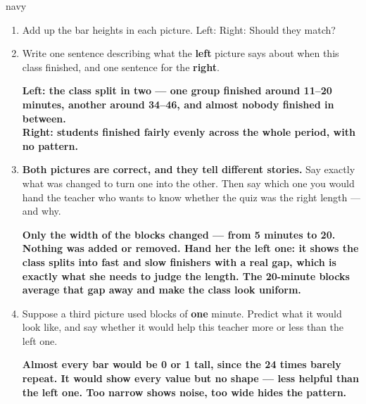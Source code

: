 \documentclass[12pt]{article}
\newcommand{\answerspace}[2]{\par\nopagebreak\noindent\begin{minipage}[t][#1][t]{\linewidth}%
  \color{keyred}\bfseries #2\end{minipage}\par}
\begin{document}
\begin{scenariobox}{navy}
\normalsize
\begin{enumerate}[label=\textbf{\alph*.}, leftmargin=1.8em, itemsep=6pt]
  \item Add up the bar heights in each picture. Left:  \quad
        Right:  \quad Should they match? 
  \item Write one sentence describing what the \textbf{left} picture says about when this class
        finished, and one sentence for the \textbf{right}.
        \answerspace{2.2cm}{Left: the class split in two --- one group finished around 11--20
        minutes, another around 34--46, and almost nobody finished in between.\\[2pt]
        Right: students finished fairly evenly across the whole period, with no pattern.}
  \item \textbf{Both pictures are correct, and they tell different stories.} Say exactly what
        was changed to turn one into the other. Then say which one you would hand the teacher
        who wants to know whether the quiz was the right length --- and why.
        \answerspace{2.6cm}{Only the width of the blocks changed --- from 5 minutes to 20.
        Nothing was added or removed. Hand her the left one: it shows the class splits into fast
        and slow finishers with a real gap, which is exactly what she needs to judge the length.
        The 20-minute blocks average that gap away and make the class look uniform.}
  \item Suppose a third picture used blocks of \textbf{one} minute. Predict what it would look
        like, and say whether it would help this teacher more or less than the left one.
        \answerspace{2.0cm}{Almost every bar would be 0 or 1 tall, since the 24 times barely
        repeat. It would show every value but no shape --- less helpful than the left one. Too
        narrow shows noise, too wide hides the pattern.}
\end{enumerate}
\end{scenariobox}
\end{document}
